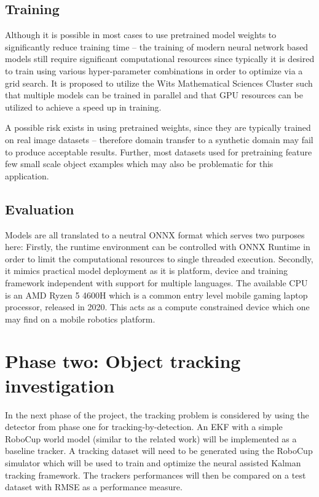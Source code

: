 \documentclass[a4paper,twoside,12pt]{report}
\begin{document}
\subsection{Training}

Although it is possible in most cases to use pretrained model weights to significantly reduce training time -- the training of modern neural network based models still require significant computational resources since typically it is desired to train using various hyper-parameter combinations in order to optimize via a grid search. It is proposed to utilize the Wits Mathematical Sciences Cluster such that multiple models can be trained in parallel and that GPU resources can be utilized to achieve a speed up in training.  

A possible risk exists in using pretrained weights, since they are typically trained on real image datasets -- therefore domain transfer to a synthetic domain may fail to produce acceptable results. Further, most datasets used for pretraining feature few small scale object examples which may also be problematic for this application.

\subsection{Evaluation}
Models are all translated to a neutral ONNX format which serves two purposes here: Firstly, the runtime environment can be controlled with ONNX Runtime in order to limit the computational resources to single threaded execution. Secondly, it mimics practical model deployment as it is platform, device and training framework independent with support for multiple languages. The available CPU is an AMD Ryzen 5 4600H which is a common entry level mobile gaming laptop processor, released in 2020. This acts as a compute constrained device which one may find on a mobile robotics platform.

\section{Phase two: Object tracking investigation}

In the next phase of the project, the tracking problem is considered by using the detector from phase one for tracking-by-detection. An EKF with a simple RoboCup world model (similar to the related work) will be implemented as a baseline tracker. A tracking dataset will need to be generated using the RoboCup simulator which will be used to train and optimize the neural assisted Kalman tracking framework. The trackers performances will then be compared on a test dataset with RMSE as a performance measure.
\end{document}
